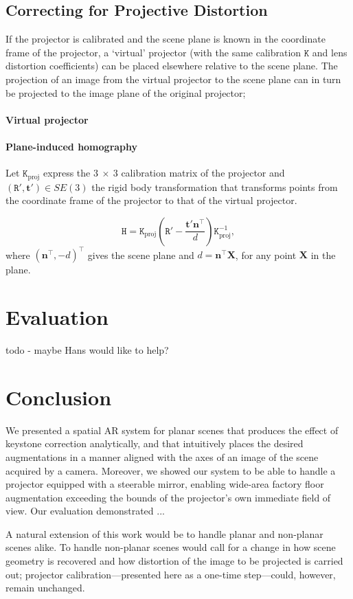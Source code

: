 \documentclass[review]{elsarticle}
\begin{document}
\subsection{Correcting for Projective Distortion}\label{sec:approach:homography}

If the projector is calibrated and the scene plane is known in the coordinate frame of the projector, a `virtual' projector (with the same calibration $\mathtt{K}$ and lens distortion coefficients) can be placed elsewhere relative to the scene plane. The projection of an image from the virtual projector to the scene plane can in turn be projected to the image plane of the original projector; 

\paragraph{Virtual projector}

\paragraph{Plane-induced homography} Let $\mathtt{K}_\text{proj}$ express the $3~\times~3$ calibration matrix of the projector and $(\mathtt{R}', \mathbf{t}') \in SE(3)$ the rigid body transformation that transforms points from the coordinate frame of the projector to that of the virtual projector.

\begin{equation}
\mathtt{H} = \mathtt{K}_\text{proj}\left(\mathtt{R}' - \frac{\mathbf{t}'\mathbf{n}^\top}{d}\right)\mathtt{K}_\text{proj}^{-1},
\label{homgen}
\end{equation}
where $(\mathbf{n}^\top, -d)^\top$ gives the scene plane and $d = \mathbf{n}^\top\mathbf{X}$, for any point $\mathbf{X}$ in the plane. 

\section{Evaluation}

todo - maybe Hans would like to help?

\section{Conclusion}

We presented a spatial AR system for planar scenes that produces the effect of keystone correction analytically, and that intuitively places the desired augmentations in a manner aligned with the axes of an image of the scene acquired by a camera. Moreover, we showed our system to be able to handle a projector equipped with a steerable mirror, enabling wide-area factory floor augmentation exceeding the bounds of the projector's own immediate field of view. Our evaluation demonstrated ...

A natural extension of this work would be to handle planar and non-planar scenes alike. To handle non-planar scenes would call for a change in how scene geometry is recovered and how distortion of the image to be projected is carried out; projector calibration---presented here as a one-time step---could, however, remain unchanged.


\end{document}
